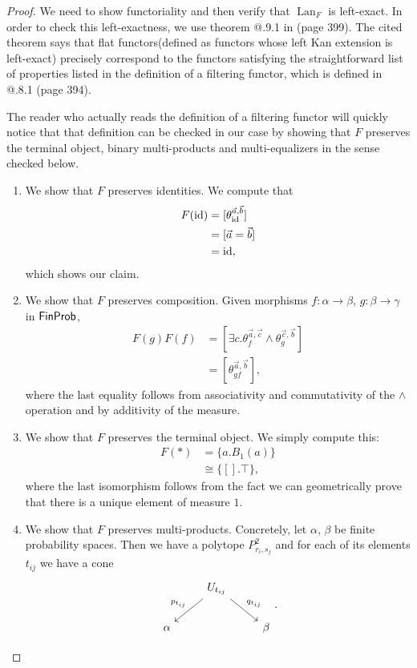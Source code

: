 \documentclass[a4paper]{amsproc}
\makeatletter
\theoremstyle{plain}
\theoremstyle{definition}
\theoremstyle{remark}
\numberwithin{equation}{section}
\newcommand{\id}{\textup{id}}
\DeclareMathOperator{\Lan}{Lan}
\newcommand{\FinProb}{\textup{\textsf{FinProb}}}
\newcommand{\Rmnum}[1]{\expandafter\@slowromancap\romannumeral #1@}
\makeatother
\begin{document}
\begin{proof}
    We need to show functoriality and then verify that $\Lan_F$ is left-exact. In order to check this left-exactness, we use theorem \Rmnum{7}.9.1 in \cite{maclane2012sheaves}(page 399). The cited theorem says that flat functors(defined as functors whose left Kan extension is left-exact) precisely correspond to the functors satisfying the straightforward list of properties listed in the definition of a filtering functor, which is defined in \Rmnum{7}.8.1 (page 394).

    The reader who actually reads the definition of a filtering functor will quickly notice that that definition can be checked in our case by showing that $F$ preserves the terminal object, binary multi-products and multi-equalizers in the sense checked below.

    \begin{enumerate}
        \item We show that $F$ preserves identities. We compute that
            \begin{align*}
                F(\id) &= [\theta^{\vec{a},\vec{b}}_{\id}] \\
                &= [\vec{a}=\vec{b}] \\
                &= \id,
            \end{align*}
            which shows our claim.
        \item We show that $F$ preserves composition. Given morphisms $f: \alpha \to \beta$, $g: \beta \to \gamma$ in $\FinProb$,
            \begin{align*}
                F(g)F(f) &= [\exists c . \theta^{\vec{a},\vec{c}}_f \wedge \theta^{\vec{c},\vec{b}}_g] \\
                &= [\theta^{\vec{a},\vec{b}}_{gf}] ,
            \end{align*}
            where the last equality follows from associativity and commutativity of the $\wedge$ operation and by additivity of the measure.
        \item We show that $F$ preserves the terminal object. We simply compute this:
            \begin{align*}
                F(*) &= \{a. B_1(a)\} \\
                &\cong \{[].\top \} ,
            \end{align*}
            where the last isomorphism follows from the fact we can geometrically prove that there is a unique element of measure $1$.
        \item We show that $F$ preserves multi-products. Concretely, let $\alpha$, $\beta$ be finite probability spaces. Then we have a polytope $P^2_{r_i,s_j}$ and for each of its elements $t_{ij}$ we have a cone
        \[\begin{tikzcd}
            & U_{t_{ij}} \arrow[ld, "p_{t_{ij}}"'] \arrow[rd, "q_{t_{ij}}"] &       \\
        \alpha &                                                               & \beta
        \end{tikzcd} .\]


\end{enumerate}
\end{proof}
\end{document}
